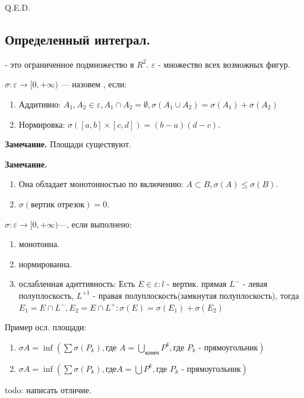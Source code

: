 \hfill Q.E.D.

\subsection{Определенный интеграл.}


  - это ограниченное подмножество в $R^2$. $\varepsilon$ - множество всех возможных фигур.

$\sigma: \varepsilon \rightarrow [0,+\infty)$ ---  назовем , если:
\begin{enumerate}
    \item Аддитивно: $A_1,A_2 \in \varepsilon, A_1\cap A_2 = \emptyset, \sigma(A_1\cup A_2) = \sigma(A_1)+\sigma(A_2)$
\item Нормировка: $\sigma ([a,b]\times[c,d]) = (b-a)(d-c)$.
\end{enumerate}

\textbf{Замечание.} Площади существуют.

\textbf{Замечание.} \begin{enumerate}
    \item Она обладает монотонностью по включению: $A \subset B, \sigma(A) \leq \sigma(B)$.
    \item $\sigma(\text{вертик отрезок})=0$.
\end{enumerate}

  $\sigma:\varepsilon\rightarrow [0,+\infty)$---, если выполнено:
\begin{enumerate}
    \item монотонна.
    \item нормированна.
    \item ослабленная адиттивность: Есть $E \in \varepsilon: l $ - вертик. прямая $L^-$ - левая полуплоскость, $L^{+1}$ - правая полуплоскость(замкнутая полуплоскость), тогда  $E_1 = E\cap L^-, E_2 = E \cap L^+: \sigma(E)=\sigma(E_1)+\sigma(E_2)$
\end{enumerate}

Пример осл. площади:
\begin{enumerate}
    \item $\sigma A = \inf (\sum \sigma(P_k), \text{где $A = \bigcup\limits_{\text{конеч}}P^k, \text{где $P_k$ - прямоугольник}$})$ 
    \item $\sigma A = \inf (\sum \sigma(P_k), \text{где} A = \bigcup P^k, \text{где $P_k$ - прямоугольник})$
\end{enumerate}

todo: написать отличие.


